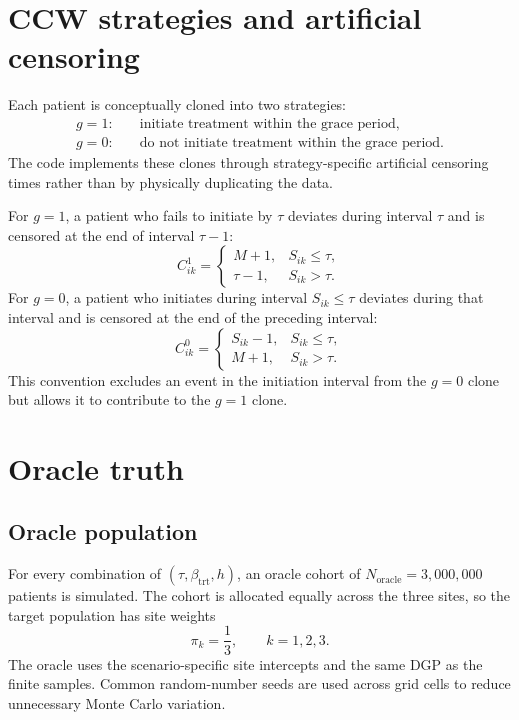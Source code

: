 \documentclass[11pt]{article}
\begin{document}
\section{CCW strategies and artificial censoring}

Each patient is conceptually cloned into two strategies:
\begin{align*}
  g=1:&\quad \text{initiate treatment within the grace period},\\
  g=0:&\quad \text{do not initiate treatment within the grace period}.
\end{align*}
The code implements these clones through strategy-specific artificial
censoring times rather than by physically duplicating the data.

For $g=1$, a patient who fails to initiate by $\tau$ deviates during interval
$\tau$ and is censored at the end of interval $\tau-1$:
\[
  C^1_{ik}
  =\begin{cases}
      M+1, & S_{ik}\leq\tau,\\
      \tau-1, & S_{ik}>\tau.
    \end{cases}
\]
For $g=0$, a patient who initiates during interval $S_{ik}\leq\tau$ deviates
during that interval and is censored at the end of the preceding interval:
\[
  C^0_{ik}
  =\begin{cases}
      S_{ik}-1, & S_{ik}\leq\tau,\\
      M+1, & S_{ik}>\tau.
    \end{cases}
\]
This convention excludes an event in the initiation interval from the
$g=0$ clone but allows it to contribute to the $g=1$ clone.

\section{Oracle truth}

\subsection{Oracle population}

For every combination of $(\tau,\beta_{\mathrm{trt}},h)$, an oracle cohort of
$N_{\mathrm{oracle}}=3{,}000{,}000$ patients is simulated. The cohort is
allocated equally across the three sites, so the target population has site
weights
\[
  \pi_k=\frac{1}{3},\qquad k=1,2,3.
\]
The oracle uses the scenario-specific site intercepts and the same DGP as the
finite samples. Common random-number seeds are used across grid cells to
reduce unnecessary Monte Carlo variation.
\end{document}
